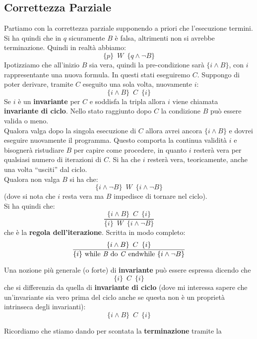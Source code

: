 			\subsection{Correttezza Parziale}
			Partiamo con la correttezza parziale supponendo a priori che l'esecuzione
			termini. Si ha quindi che in $q$ sicuramente $B$ è falsa, altrimenti non si
			avrebbe terminazione. Quindi in realtà abbiamo:
			\[\{p\}\,\,\,W\,\,\,\{q\land \neg B\}\]
			Ipotizziamo che all'inizio $B$ sia vera, quindi la pre-condizione sarà
			$\{i\land B\}$, con $i$ rappresentante una nuova formula. In questi stati
			eseguiremo $C$. Suppongo di poter derivare, tramite $C$ eseguito una sola
			volta, nuovamente $i$:
			\[\{i\land B\}\,\,\,C\,\,\,\{i\}\]
			Se $i$ è un \textbf{invariante} per $C$ e soddisfa la tripla allora $i$ viene chiamata \textbf{invariante di ciclo}. Nello stato raggiunto
			dopo $C$ la condizione $B$ può essere valida o meno. \\ Qualora valga dopo la
			singola esecuzione di $C$ allora avrei ancora $\{i\land B\}$ e dovrei eseguire
			nuovamente il programma. Questo comporta la continua validità $i$ e bisognerà ristudiare $B$
			per capire come procedere, in quanto $i$ resterà vera per qualsiasi numero di
			iterazioni di $C$. Si ha che $i$ resterà vera, teoricamente, anche una volta
			``usciti'' dal ciclo. \\Qualora non valga $B$ si ha che:
			\[\{i\land \neg B\}\,\,\,W\,\,\,\{i\land \neg B\}\]
			(dove si nota che $i$ resta vera ma $B$ impedisce di tornare nel ciclo).\\
			Si ha quindi che:
			\[\frac{\{i\land B\}\,\,\,C\,\,\,\{i\}}{\{i\}\,\,\,W\,\,\,\{i\land \neg B\}}\]
			che è la \textbf{regola dell'iterazione}. Scritta in modo completo:
			\begin{align}\label{IterationRulePartial}
				\frac{\{i\land B\}\,\,\,C\,\,\,\{i\}}{\{i\}\mbox{ while \textit{B} do 
				\textit{C} endwhile }\{i\land \neg B\}}                               
			\end{align}
			\begin{definizione}
				Una nozione più generale (o forte) di \textbf{invariante} può essere espressa dicendo che
				\[\{i\}\,\,\,C\,\,\,\{i\}\]
				che si differenzia da quella di \textbf{invariante di ciclo} (dove mi
				interessa sapere che un'invariante sia vero prima del ciclo anche se questa
				non è un proprietà intrinseca degli invarianti):
				\[\{i\land B\}\,\,\,C\,\,\,\{i\}\]
			\end{definizione}
			Ricordiamo che stiamo dando per scontata la \textbf{terminazione} tramite la
